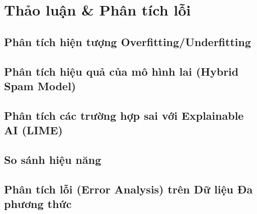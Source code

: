 \section{Thảo luận \& Phân tích lỗi}

\subsection{Phân tích hiện tượng Overfitting/Underfitting}

\subsection{Phân tích hiệu quả của mô hình lai (Hybrid Spam Model)}


\subsection{Phân tích các trường hợp sai với Explainable AI (LIME)}


\subsection{So sánh hiệu năng}

\subsection{Phân tích lỗi (Error Analysis) trên Dữ liệu Đa phương thức}

\clearpage
